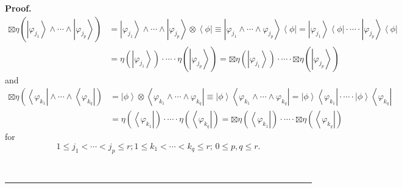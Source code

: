 \documentclass[aps,preprint]{revtex4}%
\newenvironment{proof}[1][Proof]{\noindent\textbf{#1.} }{\ \rule{0.5em}{0.5em}}
\begin{document}
\begin{proof}%
\begin{align}
\boxtimes\eta\left(  \left\vert \varphi_{j_{1}}\right\rangle \wedge
\cdots\wedge\left\vert \varphi_{j_{p}}\right\rangle \right)   &  =\left\vert
\varphi_{j_{1}}\right\rangle \wedge\cdots\wedge\left\vert \varphi_{j_{p}%
}\right\rangle \otimes\left\langle \phi\right\vert \equiv\left\vert
\varphi_{j_{1}}\wedge\cdots\wedge\varphi_{j_{p}}\right\rangle \left\langle
\phi\right\vert =\left\vert \varphi_{j_{1}}\right\rangle \left\langle
\phi\right\vert \cdot\cdots\cdot\left\vert \varphi_{j_{p}}\right\rangle
\left\langle \phi\right\vert \\
&  =\eta\left(  \left\vert \varphi_{j_{1}}\right\rangle \right)  \cdot
\cdots\cdot\eta\left(  \left\vert \varphi_{j_{p}}\right\rangle \right)
=\boxtimes\eta\left(  \left\vert \varphi_{j_{1}}\right\rangle \right)
\cdot\cdots\cdot\boxtimes\eta\left(  \left\vert \varphi_{j_{p}}\right\rangle
\right)
\end{align}
and
\begin{align}
\boxtimes\eta\left(  \left\langle \varphi_{k_{1}}\right\vert \wedge
\cdots\wedge\left\langle \varphi_{k_{q}}\right\vert \right)   &  =\left\vert
\phi\right\rangle \otimes\left\langle \varphi_{k_{1}}\wedge\cdots\wedge
\varphi_{k_{q}}\right\vert \equiv\left\vert \phi\right\rangle \left\langle
\varphi_{k_{1}}\wedge\cdots\wedge\varphi_{k_{q}}\right\vert =\left\vert
\phi\right\rangle \left\langle \varphi_{k_{1}}\right\vert \cdot\cdots
\cdot\left\vert \phi\right\rangle \left\langle \varphi_{k_{q}}\right\vert \\
&  =\eta\left(  \left\langle \varphi_{k_{1}}\right\vert \right)  \cdot
\cdots\cdot\eta\left(  \left\langle \varphi_{k_{q}}\right\vert \right)
=\boxtimes\eta\left(  \left\langle \varphi_{k_{1}}\right\vert \right)
\cdot\cdots\cdot\boxtimes\eta\left(  \left\langle \varphi_{k_{q}}\right\vert
\right)
\end{align}
for
\begin{equation}
1\leq j_{1}<\cdots<j_{p}\leq r;1\leq k_{1}<\cdots<k_{q}\leq r;\,0\leq p,q\leq
r.
\end{equation}

\end{proof}
\end{document}

